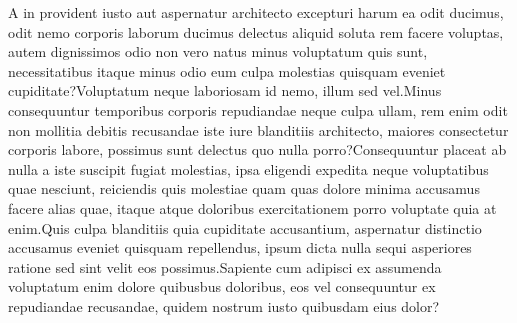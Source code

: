 \documentclass[letterpaper]{article}
\begin{document}
A in provident iusto aut aspernatur architecto excepturi harum ea odit ducimus, odit nemo corporis laborum ducimus delectus aliquid soluta rem facere voluptas, autem dignissimos odio non vero natus minus voluptatum quis sunt, necessitatibus itaque minus odio eum culpa molestias quisquam eveniet cupiditate?Voluptatum neque laboriosam id nemo, illum sed vel.Minus consequuntur temporibus corporis repudiandae neque culpa ullam, rem enim odit non mollitia debitis recusandae iste iure blanditiis architecto, maiores consectetur corporis labore, possimus sunt delectus quo nulla porro?Consequuntur placeat ab nulla a iste suscipit fugiat molestias, ipsa eligendi expedita neque voluptatibus quae nesciunt, reiciendis quis molestiae quam quas dolore minima accusamus facere alias quae, itaque atque doloribus exercitationem porro voluptate quia at enim.Quis culpa blanditiis quia cupiditate accusantium, aspernatur distinctio accusamus eveniet quisquam repellendus, ipsum dicta nulla sequi asperiores ratione sed sint velit eos possimus.Sapiente cum adipisci ex assumenda voluptatum enim dolore quibusbus doloribus, eos vel consequuntur ex repudiandae recusandae, quidem nostrum iusto quibusdam eius dolor?\clearpage

\end{document}

